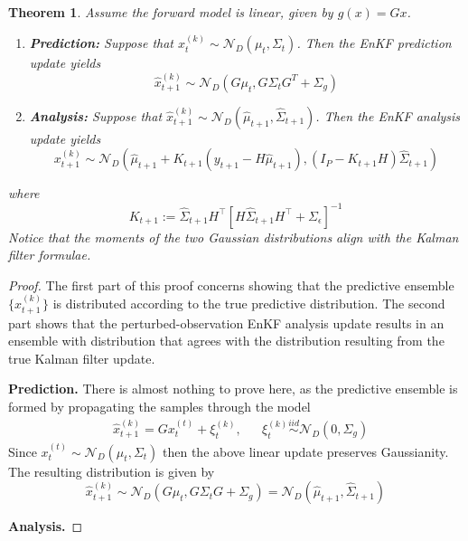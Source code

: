 \documentclass[12pt]{article}
\newtheorem{thm}{Theorem}
\begin{document}
\begin{thm} 
Assume the forward model is linear, given by $g(x) = Gx$. 
\begin{enumerate}
\item \textbf{Prediction:} Suppose that $x^{(k)}_{t} \sim \mathcal{N}_D(\mu_t, \Sigma_t)$. Then the EnKF prediction update yields 
\[\hat{x}^{(k)}_{t + 1} \sim \mathcal{N}_D(G\mu_t, G\Sigma_t G^T + \Sigma_g)\] 
\item \textbf{Analysis:} Suppose that $\hat{x}^{(k)}_{t + 1} \sim \mathcal{N}_D(\hat{\mu}_{t+1}, \hat{\Sigma}_{t+1})$. Then the EnKF analysis update yields 
\[x^{(k)}_{t+1} \sim \mathcal{N}_D(\hat{\mu}_{t+1} + K_{t+1}(y_{t+1} - H\hat{\mu}_{t+1}), \left(I_P - K_{t+1}H \right)\hat{\Sigma}_{t+1})\]
\end{enumerate}
where 
\[K_{t+1} := \hat{\Sigma}_{t+1} H^{\top} \left[H\hat{\Sigma}_{t+1} H^\top + \Sigma_{\epsilon} \right]^{-1} \]
Notice that the moments of the two Gaussian distributions align with the Kalman filter formulae. 
\end{thm}

\begin{proof} 
The first part of this proof concerns showing that the predictive ensemble $\{\hat{x}^{(k)}_{t+1}\}$ is distributed according to the true predictive distribution.
 The second part shows that the perturbed-observation EnKF analysis update results in an ensemble with distribution that agrees with the distribution 
 resulting from the true Kalman filter update.  
 
\bigskip
\noindent
\textbf{Prediction.} There is almost nothing to prove here, as the predictive ensemble is formed by propagating the samples through the model 
\begin{align*}
&\hat{x}^{(k)}_{t+1} = Gx_t^{(t)} + \xi^{(k)}_t, && \xi^{(k)}_t \overset{iid}{\sim} \mathcal{N}_D(0, \Sigma_g) 
\end{align*}
Since $x_t^{(t)} \sim \mathcal{N}_D(\mu_t, \Sigma_t)$ then the above linear update preserves Gaussianity. The resulting distribution is given by 
\[\hat{x}^{(k)}_{t+1} \sim \mathcal{N}_D(G\mu_t, G\Sigma_t G + \Sigma_g) = \mathcal{N}_D(\hat{\mu}_{t+1}, \hat{\Sigma}_{t+1})\]



\bigskip
\noindent
\textbf{Analysis.}

\end{proof}
\end{document}
